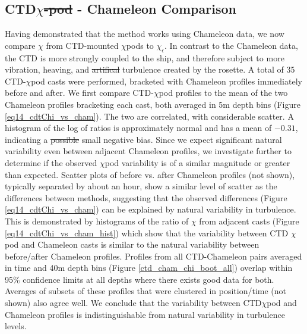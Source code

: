 \documentclass{ametsoc}
\providecommand{\DIFadd}[1]{{\protect\color{blue}\uwave{#1}}} %
\providecommand{\DIFdel}[1]{{\protect\color{red}\sout{#1}}}                      %
\providecommand{\DIFaddbegin}{} %
\providecommand{\DIFaddend}{} %
\providecommand{\DIFdelbegin}{} %
\providecommand{\DIFdelend}{} %
\begin{document}
\subsection{ CTD$\chi$\DIFdelbegin \DIFdel{-pod }\DIFdelend \DIFaddbegin \DIFadd{pod }\DIFaddend - Chameleon Comparison}

Having demonstrated that the method works using Chameleon data, we now compare \DIFdelbegin \DIFdel{$\chi$ }\DIFdelend \DIFaddbegin \DIFadd{$\chi_{\chi}^{ctd}$ }\DIFaddend from CTD-mounted $\chi$pods to \DIFdelbegin \DIFdel{$\chi_{\epsilon}$}\DIFdelend \DIFaddbegin \DIFadd{$\chi_{\epsilon}^{cham}$}\DIFaddend . In contrast to the Chameleon data, the CTD is more strongly coupled to the ship, and therefore subject to more vibration, heaving, and \DIFdelbegin \DIFdel{artifical }\DIFdelend \DIFaddbegin \DIFadd{artificial }\DIFaddend turbulence created by the rosette. A total of 35 CTD-$\chi$pod casts were performed, bracketed with Chameleon profiles immediately before and after. We first compare CTD-$\chi$pod profiles to the mean of the two Chameleon profiles bracketing each cast, both averaged in 5m depth bins (Figure \ref{eq14_cdtChi_vs_cham}). The two are correlated, with considerable scatter. A histogram of the log of ratios is approximately normal and has a mean of $-0.31$, indicating a \DIFdelbegin \DIFdel{possible }\DIFdelend small negative bias. Since we expect significant natural variability \DIFaddbegin \DIFadd{in turbulence }\DIFaddend even between adjacent Chameleon profiles, we investigate further to determine if the observed $\chi$pod variability is of a similar magnitude or greater than expected. Scatter plots of before vs. after Chameleon profiles (not shown), typically separated by about an hour, show a similar level of scatter as the differences between methods, suggesting that the observed differences (Figure \ref{eq14_cdtChi_vs_cham}) can be explained by natural variability in turbulence. This is \DIFaddbegin \DIFadd{further }\DIFaddend demonstrated by histograms of the ratio of $\chi$ from adjacent casts (Figure \ref{eq14_cdtChi_vs_cham_hist}) which show that the variability between CTD $\chi$pod and Chameleon casts is similar to the natural variability between before/after Chameleon profiles. Profiles from all CTD-Chameleon pairs averaged in time and 40m depth bins (Figure \ref{ctd_cham_chi_boot_all}) overlap within 95\% confidence limits at all depths where there exists good data for both. Averages of subsets of these profiles that were clustered in position/time (not shown) also agree well. We conclude that the variability between CTD$\chi$pod and Chameleon profiles is indistinguishable from natural variability in turbulence levels.
\end{document}
